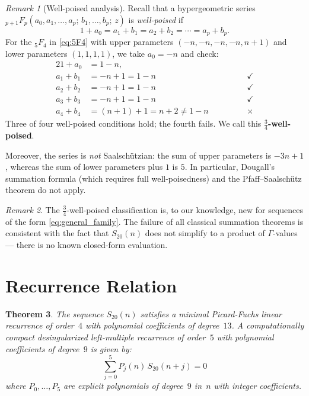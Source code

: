 \documentclass[12pt,reqno]{amsart}
\theoremstyle{plain}
\newtheorem{theorem}{Theorem}[section]
\theoremstyle{definition}
\theoremstyle{remark}
\newtheorem{remark}[theorem]{Remark}
\newcommand{\pFq}[2]{{}_{#1}F_{#2}}
\begin{document}
\begin{remark}[Well-poised analysis]\label{rem:wellpoised}
Recall that a hypergeometric series
$\pFq{p+1}{p}(a_0, a_1, \ldots, a_p;\, b_1, \ldots, b_p;\, z)$
is \emph{well-poised} if
\[
1 + a_0 = a_1 + b_1 = a_2 + b_2 = \cdots = a_p + b_p.
\]
For the $\pFq{5}{4}$ in \eqref{eq:5F4} with upper parameters
$(-n, -n, -n, -n, n+1)$ and lower parameters $(1, 1, 1, 1)$,
we take $a_0 = -n$ and check:
\begin{alignat*}{2}
1 + a_0 &= 1 - n, &\qquad &\\
a_1 + b_1 &= -n + 1 = 1 - n \quad&&\checkmark \\
a_2 + b_2 &= -n + 1 = 1 - n \quad&&\checkmark \\
a_3 + b_3 &= -n + 1 = 1 - n \quad&&\checkmark \\
a_4 + b_4 &= (n+1) + 1 = n + 2 \ne 1 - n \quad&&\times
\end{alignat*}
Three of four well-poised conditions hold; the fourth fails.
We call this \textbf{$\tfrac{3}{4}$-well-poised}.

Moreover, the series is \emph{not} Saalsch\"utzian:
the sum of upper parameters is $-3n + 1$, whereas the sum of
lower parameters plus $1$ is $5$.  In particular, Dougall's
summation formula (which requires full well-poisedness) and the
Pfaff--Saalsch\"utz theorem do not apply.
\end{remark}

\begin{remark}\label{rem:noclosed}
The $\tfrac{3}{4}$-well-poised classification is, to our knowledge,
new for sequences of the form \eqref{eq:general_family}.
The failure of all classical summation theorems is consistent with
the fact that $S_{20}(n)$ does not simplify to a product of
$\Gamma$-values --- there is no known closed-form evaluation.
\end{remark}


\section{Recurrence Relation}\label{sec:recurrence}

\begin{theorem}\label{thm:recurrence}
The sequence $S_{20}(n)$ satisfies a minimal Picard-Fuchs linear recurrence of order~$4$ with polynomial coefficients of degree~$13$.
A computationally compact desingularized left-multiple recurrence of order~$5$ with polynomial coefficients of degree~$9$ is given by:
\begin{equation}\label{eq:rec}
\sum_{j=0}^{5} P_j(n)\, S_{20}(n+j) = 0
\end{equation}
where $P_0, \ldots, P_5$ are explicit polynomials of degree~$9$
in~$n$ with integer coefficients.
\end{theorem}
\end{document}
